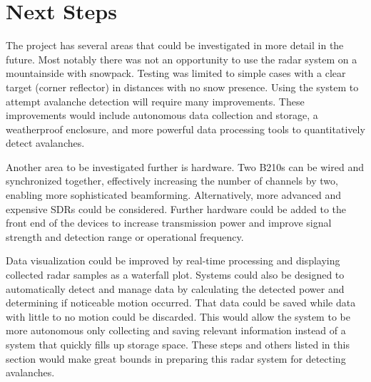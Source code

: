 \chapter{Next Steps}
\label{ch:nextSteps}

The project has several areas that could be investigated in more detail in the future.
Most notably there was not an opportunity to use the radar system on a mountainside with snowpack.
Testing was limited to simple cases with a clear target (corner reflector) in distances with no snow presence.
Using the system to attempt avalanche detection will require many improvements.
These improvements would include autonomous data collection and storage,
a weatherproof enclosure, and more powerful data processing tools to quantitatively detect avalanches.


Another area to be investigated further is hardware.
Two B210s can be wired and synchronized together, effectively increasing the number of channels by two, enabling more sophisticated beamforming.
Alternatively, more advanced and expensive SDRs could be considered.
Further hardware could be added to the front end of the devices to increase transmission power and improve signal strength and detection range or operational frequency.


Data visualization could be improved by real-time processing and displaying collected radar samples as a waterfall plot.
Systems could also be designed to automatically detect and manage data by calculating the detected power and determining if noticeable motion occurred.
That data could be saved while data with little to no motion could be discarded.
This would allow the system to be more autonomous only collecting and saving relevant information instead of a system that quickly fills up storage space.
These steps and others listed in this section would make great bounds in preparing this radar system for detecting avalanches.
